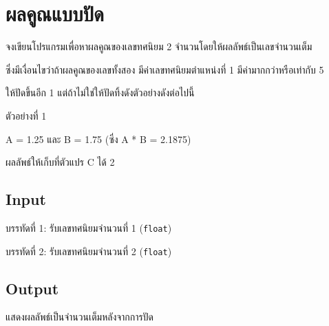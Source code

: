 \documentclass{article}
\begin{document}
\section*{ผลคูณแบบปัด}

จงเขียนโปรแกรมเพื่อหาผลคูณของเลขทศนิยม 2 จำนวนโดยให้ผลลัพธ์เป็นเลขจำนวนเต็ม



ซึ่งมีเงื่อนไขว่าถ้าผลคูณของเลขทั้งสอง มีค่าเลขทศนิยมตำแหน่งที่ 1 มีค่ามากกว่าหรือเท่ากับ 5

ให้ปัดขึ้นอีก 1 แต่ถ้าไม่ใช่ให้ปัดทิ้งดังตัวอย่างดังต่อไปนี้



ตัวอย่างที่ 1



A = 1.25 และ B = 1.75 (ซึ่ง A * B = 2.1875)



ผลลัพธ์ให้เก็บที่ตัวแปร C ได้ 2



\subsection*{Input}
บรรทัดที่ 1: รับเลขทศนิยมจำนวนที่ 1 (\texttt{float})



บรรทัดที่ 2: รับเลขทศนิยมจำนวนที่ 2 (\texttt{float})



\subsection*{Output}
แสดงผลลัพธ์เป็นจำนวนเต็มหลังจากการปัด\\
\end{document}
